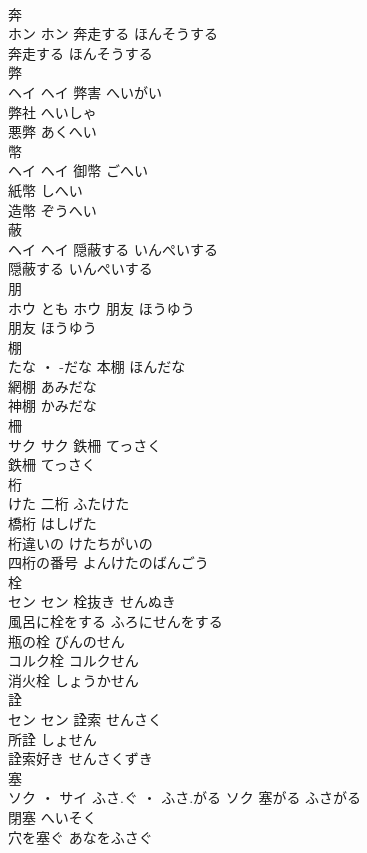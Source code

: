 \documentclass[8pt]{extreport}
\begin{document}
\begin{CJK}{UTF8}{min}
\\	奔	
\\	ホン		ホン	奔走する	ほんそうする	
\\	奔走する	ほんそうする	
\\	弊	
\\	ヘイ		ヘイ	弊害	へいがい	
\\	弊社	へいしゃ	
\\	悪弊	あくへい	
\\	幣	
\\	ヘイ		ヘイ	御幣	ごへい	
\\	紙幣	しへい	
\\	造幣	ぞうへい	
\\	蔽	
\\	ヘイ		ヘイ	隠蔽する	いんぺいする	
\\	隠蔽する	いんぺいする	
\\	朋	
\\	ホウ	とも	ホウ	朋友	ほうゆう	
\\	朋友	ほうゆう	
\\	棚	
\\	たな ・ -だな		本棚	ほんだな	
\\	網棚	あみだな	
\\	神棚	かみだな	
\\	柵	
\\	サク		サク	鉄柵	てっさく	
\\	鉄柵	てっさく	
\\	桁	
\\	けた		二桁	ふたけた	
\\	橋桁	はしげた	
\\	桁違いの	けたちがいの	
\\	四桁の番号	よんけたのばんごう	
\\	栓	
\\	セン		セン	栓抜き	せんぬき	
\\	風呂に栓をする	ふろにせんをする	
\\	瓶の栓	びんのせん	
\\	コルク栓	コルクせん	
\\	消火栓	しょうかせん	
\\	詮	
\\	セン		セン	詮索	せんさく	
\\	所詮	しょせん	
\\	詮索好き	せんさくずき	
\\	塞	
\\	ソク ・ サイ	ふさ.ぐ ・ ふさ.がる	ソク	塞がる	ふさがる	
\\	閉塞	へいそく	
\\	穴を塞ぐ	あなをふさぐ	

\end{CJK}
\end{document}
